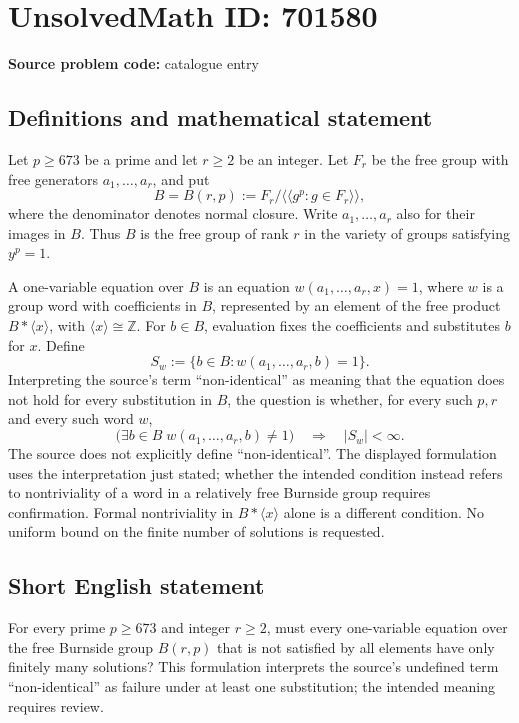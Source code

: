 \documentclass[11pt]{article}
\newcommand{\Z}{\mathbb{Z}}
\begin{document}
\section*{UnsolvedMath ID: 701580}
\textbf{Source problem code:} catalogue entry
\subsection{Definitions and mathematical statement}
Let \(p\geq 673\) be a prime and let \(r\geq 2\) be an integer. Let \(F_r\) be the free group with free generators \(a_1,\ldots,a_r\), and put
\[
B=B(r,p):=F_r/\langle\!\langle g^p:g\in F_r\rangle\!\rangle,
\]
where the denominator denotes normal closure. Write \(a_1,\ldots,a_r\) also for their images in \(B\). Thus \(B\) is the free group of rank \(r\) in the variety of groups satisfying \(y^p=1\).

A one-variable equation over \(B\) is an equation \(w(a_1,\ldots,a_r,x)=1\), where \(w\) is a group word with coefficients in \(B\), represented by an element of the free product \(B*\langle x\rangle\), with \(\langle x\rangle\cong\Z\). For \(b\in B\), evaluation fixes the coefficients and substitutes \(b\) for \(x\). Define
\[
S_w:=\{b\in B:w(a_1,\ldots,a_r,b)=1\}.
\]
Interpreting the source's term ``non-identical'' as meaning that the equation does not hold for every substitution in \(B\), the question is whether, for every such \(p,r\) and every such word \(w\),
\[
\bigl(\exists b\in B\; w(a_1,\ldots,a_r,b)\neq 1\bigr)
\quad\Longrightarrow\quad |S_w|<\infty.
\]
The source does not explicitly define ``non-identical''. The displayed formulation uses the interpretation just stated; whether the intended condition instead refers to nontriviality of a word in a relatively free Burnside group requires confirmation. Formal nontriviality in \(B*\langle x\rangle\) alone is a different condition. No uniform bound on the finite number of solutions is requested.
\subsection{Short English statement}
For every prime \(p\geq 673\) and integer \(r\geq 2\), must every one-variable equation over the free Burnside group \(B(r,p)\) that is not satisfied by all elements have only finitely many solutions? This formulation interprets the source's undefined term ``non-identical'' as failure under at least one substitution; the intended meaning requires review.
\end{document}
